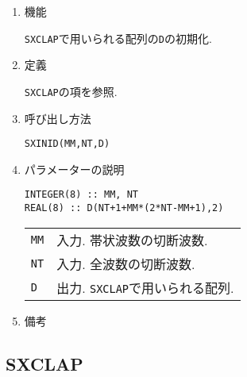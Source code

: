 \documentclass[a4j]{jsarticle}
\begin{document}
\begin{enumerate}

\item 機能 

\texttt{SXCLAP}で用いられる配列の\texttt{D}の初期化.

\item 定義

\texttt{SXCLAP}の項を参照.

\item 呼び出し方法 

\texttt{SXINID(MM,NT,D)}
  
\item パラメーターの説明

\begin{verbatim}
INTEGER(8) :: MM, NT
REAL(8) :: D(NT+1+MM*(2*NT-MM+1),2)
\end{verbatim}

\begin{tabular}{ll}
\texttt{MM} & 入力. 帯状波数の切断波数.\\  
\texttt{NT} & 入力. 全波数の切断波数.\\
\texttt{D} & 出力. \texttt{SXCLAP}で用いられる配列.
\end{tabular}

\item 備考
    
\end{enumerate}


\subsection{SXCLAP}
\end{document}
